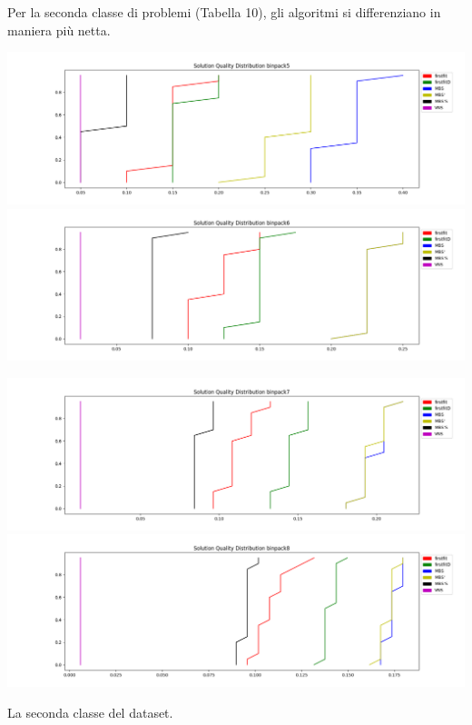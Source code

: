 \documentclass{article}
\begin{document}
Per la seconda classe di problemi (Tabella 10), gli algoritmi si differenziano in maniera più netta.
\begin{table}[H]
\includegraphics[scale=0.23]{pic/binpack5}
\includegraphics[scale=0.23]{pic/binpack6}

\includegraphics[scale=0.23]{pic/binpack7}
\includegraphics[scale=0.23]{pic/binpack8}
\caption{La seconda classe del dataset.}
\end{table}
\end{document}
